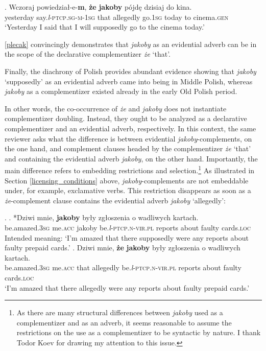 \documentclass[output=paper
,modfonts
,nonflat]{langsci/langscibook}
\newcommand{\glossformat}[1]{\textsc{#1}}
\newcommand{\firstperson}{\glossformat{1}\xspace}
\newcommand{\thirdperson}{\glossformat{3}\xspace}
\newcommand{\acc}{\glossformat{acc}\xspace}
\newcommand{\gen}{\glossformat{gen}\xspace}
\newcommand{\loc}{\glossformat{loc}\xspace}
\newcommand{\lptcp}{\emph{l}\glossformat{-ptcp}\xspace}
\newcommand{\masc}{\glossformat{m}\xspace}
\newcommand{\nvir}{\glossformat{n-vir}\xspace}
\newcommand{\pl}{\glossformat{pl}\xspace}
\newcommand{\sg}{\glossformat{sg}\xspace}
\begin{document}
\exg.		Wczoraj powiedział-e-\textbf{m}, \textbf{że} \textbf{jakoby} pójdę dzisiaj do kina. \label{plecak} \\
  		yesterday say.{\lptcp}.{\sg}-{\masc}-{\firstperson}{\sg} that allegedly go.{\firstperson}{\sg} today to cinema.{\gen} \\
		`Yesterday I said that  I will supposedly go to the cinema today.'

\ref{plecak} convincingly demonstrates that \emph{jakoby} as an evidential adverb can be in the scope of the declarative complementizer \emph{że} `that'. 

\noindent Finally, the diachrony of Polish provides abundant evidence showing that \emph{jakoby} `supposedly' as an evidential adverb came into being in Middle Polish, whereas \emph{jakoby} as a complementizer existed already in the early Old Polish period. 

In other words, the co-occurrence of \emph{że} and \emph{jakoby} does not instantiate complementizer doubling. Instead, they ought to be analyzed as a declarative complementizer and an evidential adverb, respectively. In this context, the same reviewer asks what the difference is between evidential \emph{jakoby}-complements, on the one hand, and complement clauses headed by the complementizer \emph{że} `that' and containing the evidential adverb \emph{jakoby}, on the other hand. Importantly, the main difference refers to embedding restrictions and selection.\footnote{As there are many structural differences between \emph{jakoby} used as a complementizer and as an adverb, it seems reasonable to assume the restrictions on the use as a complementizer to be syntactic by nature. I thank Todor Koev for drawing my attention to this issue.
}
As illustrated in Section \ref{licensing_conditions} above, \emph{jakoby}-complements are not embeddable under, for example, exclamative verbs. This restriction disappears as soon as a \emph{że}-complement clause contains the evidential adverb \emph{jakoby}  `allegedly':

\ex.	\ag.		*Dziwi mnie, \textbf{jakoby} były zgłoszenia o wadliwych kartach. \\
			be.amazed.{\thirdperson}{\sg} me.{\acc} jakoby be.{\lptcp}.{\nvir}.{\pl} reports about faulty cards.{\loc} \\
			Intended meaning: `I'm amazed that there supposedly were any reports about faulty prepaid cards.' 
	\bg.		Dziwi mnie, \textbf{że} \textbf{jakoby} były zgłoszenia o wadliwych kartach. \\
			be.amazed.{\thirdperson}{\sg} me.{\acc} that allegedly be.{\lptcp}.{\nvir}.{\pl} reports about faulty cards.{\loc} \\
			`I'm amazed that there allegedly were any reports about faulty prepaid cards.' 
	
\end{document}
